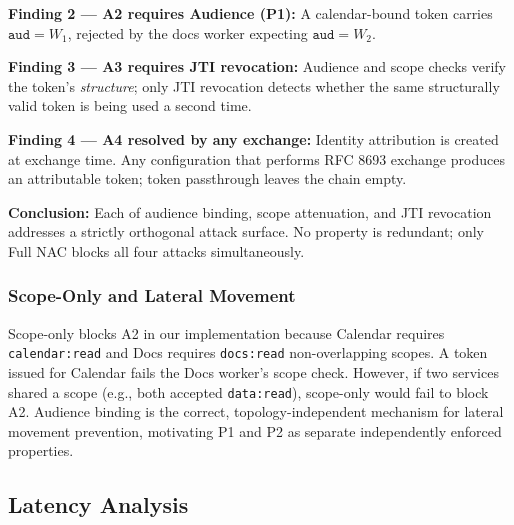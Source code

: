 \documentclass[journal]{IEEEtran}
\begin{document}
\textbf{Finding 2 — A2 requires Audience (P1):} A calendar-bound token carries
$\texttt{aud}=W_1$, rejected by the docs worker expecting $\texttt{aud}=W_2$.

\textbf{Finding 3 — A3 requires JTI revocation:} Audience and scope checks
verify the token's \textit{structure}; only JTI revocation detects whether the
same structurally valid token is being used a second time.

\textbf{Finding 4 — A4 resolved by any exchange:} Identity attribution is
created at exchange time. Any configuration that performs RFC 8693 exchange
produces an attributable token; token passthrough leaves the chain empty.

\textbf{Conclusion:} Each of audience binding, scope attenuation, and JTI
revocation addresses a strictly orthogonal attack surface. No property is
redundant; only Full NAC blocks all four attacks simultaneously.

\subsubsection{Scope-Only and Lateral Movement}
\label{sec:scope_caveat}
Scope-only blocks A2 in our implementation because Calendar requires
\texttt{calendar:read} and Docs requires \texttt{docs:read} non-overlapping
scopes. A token issued for Calendar fails the Docs worker's scope check.
However, if two services shared a scope (e.g., both accepted \texttt{data:read}),
scope-only would fail to block A2. Audience binding is the correct,
topology-independent mechanism for lateral movement prevention, motivating P1
and P2 as separate independently enforced properties.

\subsection{Latency Analysis}

\begin{table}[h]
\caption{End-to-end latency of \texttt{prepare\_daily\_briefing} ($N=30$)}
\label{tab:latency}
\centering
\footnotesize
\setlength{\tabcolsep}{3pt}
\end{table}
\end{document}
